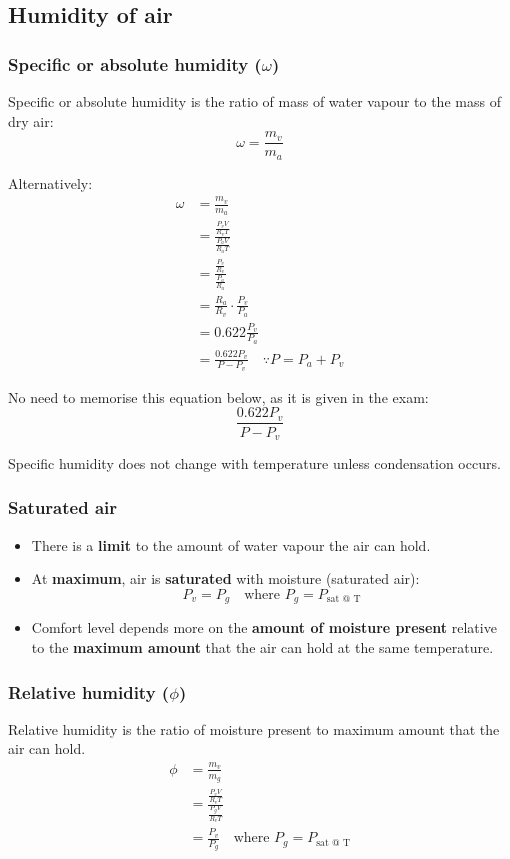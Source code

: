 \documentclass[11pt]{article}
\begin{document}
\subsection{Humidity of air}
\label{sec:org0badd36}

\subsubsection{Specific or absolute humidity (\(\omega\))}
\label{sec:org62381b0}
Specific or absolute humidity is the ratio of mass of water vapour to the mass of dry air:
\[\omega = \frac{m_v}{m_a}\]

Alternatively:
\begin{align*}
\omega &= \frac{m_v}{m_a} \\
&= \frac{\frac{P_v V}{R_v T}}{\frac{P_a V}{R_a T}} \\
&= \frac{\frac{P_v}{R_v}}{\frac{P_a}{R_a}} \\
&= \frac{R_a}{R_v} \cdot \frac{P_v}{P_a} \\
&= 0.622 \frac{P_v}{P_a} \\
&= \frac{0.622 P_v}{P - P_v} \quad \because P = P_a + P_v
\end{align*}

No need to memorise this equation below, as it is given in the exam:
\[\frac{0.622 P_v}{P - P_v}\]

Specific humidity does not change with temperature unless condensation occurs.

\subsubsection{Saturated air}
\label{sec:orga8ae371}
\begin{itemize}
\item There is a \textbf{limit} to the amount of water vapour the air can hold.
\item At \textbf{maximum}, air is \textbf{saturated} with moisture (saturated air):
\[P_v = P_g \quad \text{where } P_g = P_{\text{sat @ T}}\]
\item Comfort level depends more on the \textbf{amount of moisture present} relative to the \textbf{maximum amount} that the air can hold at the same temperature.
\end{itemize}

\subsubsection{Relative humidity (\(\phi\))}
\label{sec:orgdad01a5}
Relative humidity is the ratio of moisture present to maximum amount that the air can hold.
\begin{align*}
\phi &= \frac{m_v}{m_g} \\
&= \frac{\frac{P_v V}{R_v T}}{\frac{P_g V}{R_v T}} \\
&= \frac{P_v}{P_g} \quad \text{where } P_g = P_{\text{sat @ T}}
\end{align*}
\end{document}
